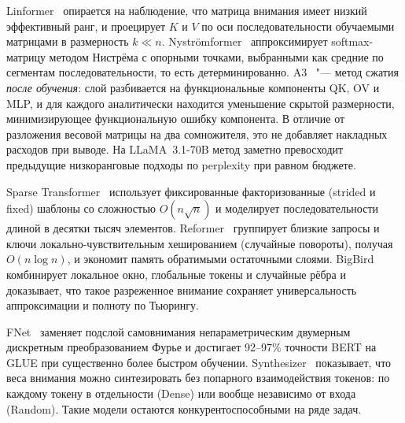 Linformer~\cite{wang2020linformer} опирается на наблюдение, что
матрица внимания имеет низкий эффективный ранг, и проецирует $K$ и
$V$ по оси последовательности обучаемыми матрицами в размерность
$k\ll n$. Nyströmformer~\cite{xiong2021nystrom} аппроксимирует
softmax-матрицу методом Нистрёма с опорными точками, выбранными как
средние по сегментам последовательности, то есть
детерминированно. A3~\cite{wong2025a3} "--- метод сжатия \emph{после
обучения}: слой разбивается на функциональные компоненты QK, OV и MLP,
и для каждого аналитически находится уменьшение скрытой размерности,
минимизирующее функциональную ошибку компонента. В отличие от
разложения весовой матрицы на два сомножителя, это не добавляет
накладных расходов при выводе. На LLaMA~3.1-70B метод заметно
превосходит предыдущие низкоранговые подходы по perplexity при равном
бюджете.

Sparse Transformer~\cite{child2019sparse} использует фиксированные
факторизованные (strided и fixed) шаблоны со сложностью
$O(n\sqrt{n})$ и моделирует последовательности длиной в десятки тысяч
элементов. Reformer~\cite{kitaev2020reformer} группирует близкие
запросы и ключи локально-чувствительным хешированием (случайные
повороты), получая $O(n\log n)$, и экономит память обратимыми
остаточными слоями. BigBird~\cite{zaheer2020bigbird} комбинирует
локальное окно, глобальные токены и случайные рёбра и доказывает, что
такое разреженное внимание сохраняет универсальность аппроксимации и
полноту по Тьюрингу.

FNet~\cite{leethorp2022fnet} заменяет подслой самовнимания
непараметрическим двумерным дискретным преобразованием Фурье и
достигает 92--97\% точности BERT на GLUE при существенно более
быстром обучении. Synthesizer~\cite{tay2021synthesizer} показывает,
что веса внимания можно синтезировать без попарного взаимодействия
токенов: по каждому токену в отдельности (Dense) или вообще
независимо от входа (Random). Такие модели остаются
конкурентоспособными на ряде задач.


